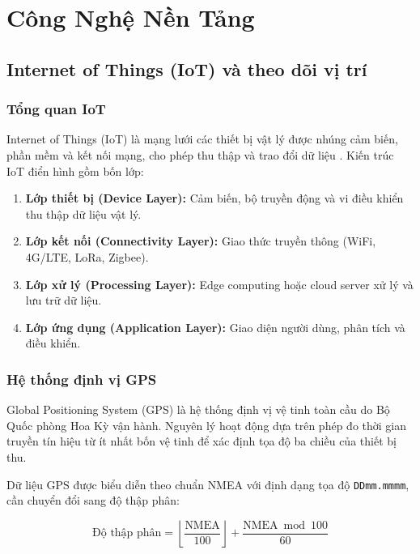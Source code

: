 \documentclass[13pt, a4paper]{report}
\begin{document}
\chapter{Công Nghệ Nền Tảng}

\section{Internet of Things (IoT) và theo dõi vị trí}

\subsection{Tổng quan IoT}

Internet of Things (IoT) là mạng lưới các thiết bị vật lý được nhúng cảm biến, phần mềm và kết nối mạng, cho phép thu thập và trao đổi dữ liệu \cite{atzori2010iot}. Kiến trúc IoT điển hình gồm bốn lớp:

\begin{enumerate}
  \item \textbf{Lớp thiết bị (Device Layer):} Cảm biến, bộ truyền động và vi điều khiển thu thập dữ liệu vật lý.
  \item \textbf{Lớp kết nối (Connectivity Layer):} Giao thức truyền thông (WiFi, 4G/LTE, LoRa, Zigbee).
  \item \textbf{Lớp xử lý (Processing Layer):} Edge computing hoặc cloud server xử lý và lưu trữ dữ liệu.
  \item \textbf{Lớp ứng dụng (Application Layer):} Giao diện người dùng, phân tích và điều khiển.
\end{enumerate}

\subsection{Hệ thống định vị GPS}

Global Positioning System (GPS) là hệ thống định vị vệ tinh toàn cầu do Bộ Quốc phòng Hoa Kỳ vận hành. Nguyên lý hoạt động dựa trên phép đo thời gian truyền tín hiệu từ ít nhất bốn vệ tinh để xác định tọa độ ba chiều của thiết bị thu.

Dữ liệu GPS được biểu diễn theo chuẩn NMEA với định dạng tọa độ \texttt{DDmm.mmmm}, cần chuyển đổi sang độ thập phân:

\begin{equation}
  \text{Độ thập phân} = \left\lfloor \frac{\text{NMEA}}{100} \right\rfloor + \frac{\text{NMEA} \bmod 100}{60}
  \label{eq:nmea_convert}
\end{equation}
\end{document}
